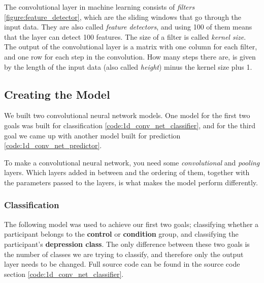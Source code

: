 The convolutional layer in machine learning consists of \textit{filters} \ref{figure:feature_detector}, which are the sliding windows that go through the input data.  They are also called \textit{feature detectors}, and using 100 of them means that the layer can detect 100 features. The size of a filter is called \textit{kernel size}. The output of the convolutional layer is a matrix with one column for each filter, and one row for each step in the convolution. How many steps there are, is given by the length of the input data (also called \textit{height}) minus the kernel size plus 1.

\subsection{Creating the Model}
We built two convolutional neural network models. One model for the first two goals was built for classification \ref{code:1d_conv_net_classifier}, and for the third goal we came up with another model built for prediction \ref{code:1d_conv_net_predictor}.

To make a convolutional neural network, you need some \textit{convolutional} and \textit{pooling} layers. Which layers added in between and the ordering of them, together with the parameters passed to the layers, is what makes the model perform differently. 

\subsubsection{Classification}
The following model was used to achieve our first two goals; classifying whether a participant belongs to the \textbf{control} or \textbf{condition} group, and classifying the participant's \textbf{depression class}. The only difference between these two goals is the number of classes we are trying to classify, and therefore only the output layer needs to be changed. Full source code can be found in the source code section \ref{code:1d_conv_net_classifier}.

